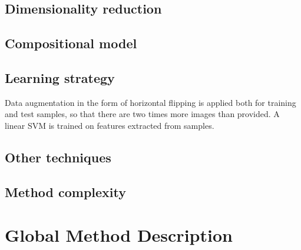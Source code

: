 \documentclass{article}
\begin{document}
\subsection{Dimensionality reduction}

\subsection{Compositional model}

\subsection{Learning strategy}
Data augmentation in the form of horizontal flipping is applied both for training and test samples, so that there are two times more images than provided.
A linear SVM is trained on features extracted from samples.

\subsection{Other techniques}

\subsection{Method complexity}


\section{Global Method Description}
\end{document}
